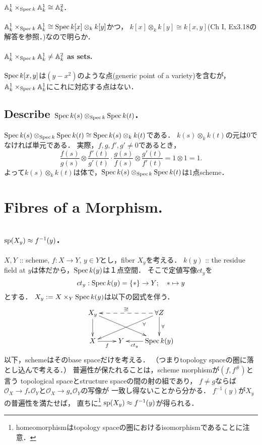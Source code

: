 \documentclass[a4paper]{jsarticle}
\newcommand{\shO}{\mathcal{O}}
\newcommand{\basesp}{\operatorname{sp}}
\begin{document}
    \paragraph{$\mathbb{A}^1_k \times_{\operatorname{Spec} k} \mathbb{A}^1_k \cong \mathbb{A}^2_k$.}
    $\mathbb{A}^1_k \times_{\operatorname{Spec} k} \mathbb{A}^1_k \cong \operatorname{Spec} k[x] \otimes_k k[y]$かつ，
    $k[x] \otimes_k k[y] \cong k[x,y]$(Ch I, Ex3.18の解答を参照．)なので明らか．

    \paragraph{$\mathbb{A}^1_k \times_{\operatorname{Spec} k} \mathbb{A}^1_k \neq \mathbb{A}^2_k$ as sets.}
    $\operatorname{Spec} k[x,y]$は$(y-x^2)$のような点(generic point of a variety)を含むが，
    $\mathbb{A}^1_k \times_{\operatorname{Spec} k} \mathbb{A}^1_k$にこれに対応する点はない．

    \subsection{Describe $\operatorname{Spec} k(s) \otimes_{\operatorname{Spec} k} \operatorname{Spec} k(t)$.}
    $\operatorname{Spec} k(s) \otimes_{\operatorname{Spec} k} \operatorname{Spec} k(t) \cong \operatorname{Spec} k(s) \otimes_k k(t)$である．
    $k(s) \otimes_k k(t)$の元は$0$でなければ単元である．
    実際，$f,g,f',g' \neq 0$であるとき，
    \[ \frac{f(s)}{g(s)} \otimes \frac{f'(t)}{g'(t)} \cdot \frac{g(s)}{f(s)} \otimes \frac{g'(t)}{f'(t)}=1 \otimes 1=1. \]
    よって$k(s) \otimes_k k(t)$は体で，$\operatorname{Spec} k(s) \otimes_{\operatorname{Spec} k} \operatorname{Spec} k(t)$は1点scheme．

\section{Fibres of a Morphism.} %
\subsection{$\basesp(X_y) \homeo f^{-1}(y)$.}
    $X,Y$ :: scheme, $f: X \to Y$, $y \in Y$とし，fiber $X_y$を考える．
    $k(y)$ :: the residue field at $y$は体だから，$\operatorname{Spec} k(y)$は１点空間．
    そこで定値写像$ct_y$を
    \[ ct_y: \operatorname{Spec} k(y)=\{*\} \to Y;~~~ * \mapsto y \]とする．
    $X_y:=X \times_Y \operatorname{Spec} k(y)$は以下の図式を伴う．
    \[
    \xymatrix
    {
    \ar[d] \ar[drr] X_y & {} &\ar@{-->}[ll]_{\exists!} \forall Z \ar[d]^-{\forall} \ar[dll]^(0.25){\forall}\\
    X \ar[r]_-{f} & Y & \ar[l]^-{ct_y} \Spec k(y)
    }
    \]
    以下，schemeはそのbase spaceだけを考える．
    （つまりtopology spaceの圏に落とし込んで考える．）
    普遍性が保たれることは，scheme morphismが$(f,f^{\#})$と言う
    topological spaceとstructure spaceの間の射の組であり，
    $f \neq g$ならば$\shO_X \to f_*\shO_Y$と$\shO_X \to g_*\shO_Y$の写像が
    一致し得ないことから分かる．
    $f^{-1}(y)$が$X_y$の普遍性を満たせば，
    直ちに\footnote{homeomorphismはtopology spaceの圏におけるisomorphismであることに注意．}
    $\basesp(X_y) \homeo f^{-1}(y)$が得られる．
\end{document}
